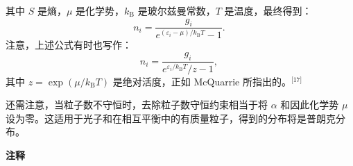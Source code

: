 其中 \( S \) 是熵，\( \mu \) 是化学势，\( k_{\text{B}} \) 是玻尔兹曼常数，\( T \) 是温度，最终得到：
\[
n_i = \frac{g_i}{e^{(\varepsilon_i - \mu)/k_{\text{B}} T} - 1}.~
\]
注意，上述公式有时也写作：
\[
n_i = \frac{g_i}{e^{\varepsilon_i / k_{\text{B}} T} / z - 1},~
\]
其中 \( z = \exp(\mu / k_{\text{B}} T) \) 是绝对活度，正如 McQuarrie 所指出的。\(^\text{[17]}\)

还需注意，当粒子数不守恒时，去除粒子数守恒约束相当于将 \( \alpha \) 和因此化学势 \( \mu \) 设为零。这适用于光子和在相互平衡中的有质量粒子，得到的分布将是普朗克分布。

\textbf{注释}